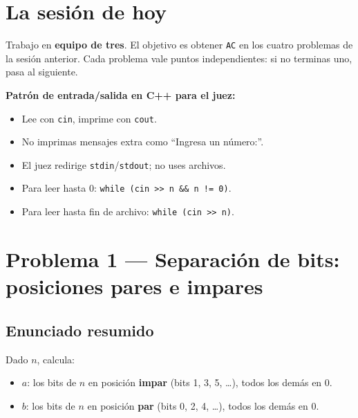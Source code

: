 \documentclass[12pt, oneside]{article}
\begin{document}
\newpage

\section{La sesión de hoy}

Trabajo en \textbf{equipo de tres}.  El objetivo es obtener \texttt{AC} en los
cuatro problemas de la sesión anterior.  Cada problema vale puntos
independientes: si no terminas uno, pasa al siguiente.

\begin{recuerda}
  \textbf{Patrón de entrada/salida en C++ para el juez:}
  \begin{itemize}
    \item Lee con \texttt{cin}, imprime con \texttt{cout}.
    \item No imprimas mensajes extra como ``Ingresa un número:''.
    \item El juez redirige \texttt{stdin}/\texttt{stdout}; no uses archivos.
    \item Para leer hasta 0: \texttt{while (cin >> n \&\& n != 0)}.
    \item Para leer hasta fin de archivo: \texttt{while (cin >> n)}.
  \end{itemize}
\end{recuerda}

\newpage

\section{Problema 1 — Separación de bits: posiciones pares e impares}

\subsection{Enunciado resumido}

Dado $n$, calcula:
\begin{itemize}
  \item $a$: los bits de $n$ en posición \textbf{impar} (bits 1, 3, 5, \ldots),
        todos los demás en 0.
  \item $b$: los bits de $n$ en posición \textbf{par} (bits 0, 2, 4, \ldots),
        todos los demás en 0.
\end{itemize}
\end{document}
